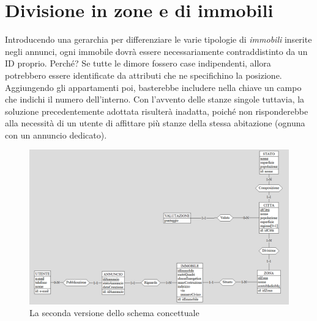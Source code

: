 \documentclass[a4paper,12pt]{report}
\begin{document}
        \newpage
        \section{Divisione in zone e di immobili}
        Introducendo una gerarchia per differenziare le varie tipologie di \textit{immobili} inserite negli annunci,
        ogni immobile dovrà essere necessariamente contraddistinto da un ID proprio. Perché? Se tutte le dimore
        fossero case indipendenti, allora potrebbero essere identificate da attributi che ne specifichino la posizione.
        Aggiungendo gli appartamenti poi, basterebbe includere nella chiave un campo che indichi il numero dell'interno.
        Con l'avvento delle stanze singole tuttavia, la soluzione precedentemente adottata risulterà inadatta, poiché 
        non risponderebbe alla necessità di un utente di affittare più stanze della stessa abitazione (ognuna con un 
        annuncio dedicato).

        \begin{figure}[ht]
            \centering{}
            \includegraphics[width=\linewidth]{./images/second.png}
            \caption{La seconda versione dello schema concettuale}
        \end{figure}
        
\end{document}
